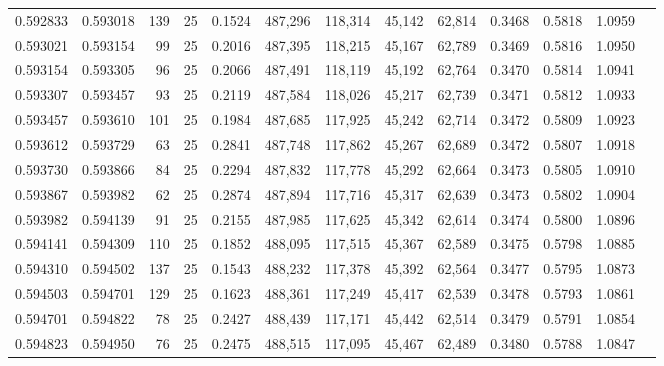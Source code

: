 \begin{tabular}{rrrrrrrrrrrrr}
0.592833 & 0.593018 &   139 &  25 &                                     0.1524 & 487,296 & 118,314 &  45,142 &  62,814 & 0.3468 & 0.5818 & 1.0959 \\
0.593021 & 0.593154 &    99 &  25 &                                     0.2016 & 487,395 & 118,215 &  45,167 &  62,789 & 0.3469 & 0.5816 & 1.0950 \\
0.593154 & 0.593305 &    96 &  25 &                                     0.2066 & 487,491 & 118,119 &  45,192 &  62,764 & 0.3470 & 0.5814 & 1.0941 \\
0.593307 & 0.593457 &    93 &  25 &                                     0.2119 & 487,584 & 118,026 &  45,217 &  62,739 & 0.3471 & 0.5812 & 1.0933 \\
0.593457 & 0.593610 &   101 &  25 &                                     0.1984 & 487,685 & 117,925 &  45,242 &  62,714 & 0.3472 & 0.5809 & 1.0923 \\
0.593612 & 0.593729 &    63 &  25 &                                     0.2841 & 487,748 & 117,862 &  45,267 &  62,689 & 0.3472 & 0.5807 & 1.0918 \\
0.593730 & 0.593866 &    84 &  25 &                                     0.2294 & 487,832 & 117,778 &  45,292 &  62,664 & 0.3473 & 0.5805 & 1.0910 \\
0.593867 & 0.593982 &    62 &  25 &                                     0.2874 & 487,894 & 117,716 &  45,317 &  62,639 & 0.3473 & 0.5802 & 1.0904 \\
0.593982 & 0.594139 &    91 &  25 &                                     0.2155 & 487,985 & 117,625 &  45,342 &  62,614 & 0.3474 & 0.5800 & 1.0896 \\
0.594141 & 0.594309 &   110 &  25 &                                     0.1852 & 488,095 & 117,515 &  45,367 &  62,589 & 0.3475 & 0.5798 & 1.0885 \\
0.594310 & 0.594502 &   137 &  25 &                                     0.1543 & 488,232 & 117,378 &  45,392 &  62,564 & 0.3477 & 0.5795 & 1.0873 \\
0.594503 & 0.594701 &   129 &  25 &                                     0.1623 & 488,361 & 117,249 &  45,417 &  62,539 & 0.3478 & 0.5793 & 1.0861 \\
0.594701 & 0.594822 &    78 &  25 &                                     0.2427 & 488,439 & 117,171 &  45,442 &  62,514 & 0.3479 & 0.5791 & 1.0854 \\
0.594823 & 0.594950 &    76 &  25 &                                     0.2475 & 488,515 & 117,095 &  45,467 &  62,489 & 0.3480 & 0.5788 & 1.0847 \\

\end{tabular}
